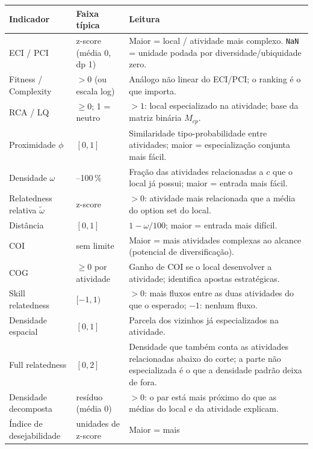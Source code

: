 \documentclass[12pt, a4paper]{article}
\begin{document}
{\renewcommand{\arraystretch}{1.35}\small
\begin{longtable}{>{\raggedright\arraybackslash}p{3.4cm}>{\raggedright\arraybackslash}p{3.0cm}>{\raggedright\arraybackslash}p{8.6cm}}
\toprule
\textbf{Indicador} & \textbf{Faixa t\'{i}pica} & \textbf{Leitura} \\
\midrule\endhead
ECI / PCI & z-score (m\'{e}dia 0, dp 1) & Maior = local / atividade mais
  complexo. \texttt{NaN} = unidade podada por diversidade/ubiquidade
  zero. \\
Fitness / Complexity & $> 0$ (ou escala log) & An\'{a}logo n\~{a}o linear
  do ECI/PCI; o ranking \'{e} o que importa. \\
RCA / LQ & $\geq 0$; 1 = neutro & $>1$: local especializado na
  atividade; base da matriz bin\'{a}ria $M_{cp}$. \\
Proximidade $\phi$ & $[0, 1]$ & Similaridade tipo-probabilidade entre
  atividades; maior = especializa\c{c}\~{a}o conjunta mais f\'{a}cil. \\
Densidade $\omega$ & 0--100\,\% & Fra\c{c}\~{a}o das atividades
  relacionadas a $c$ que o local j\'{a} possui; maior = entrada mais
  f\'{a}cil. \\
Relatedness relativa $\tilde\omega$ & z-score & $>0$: atividade mais
  relacionada que a m\'{e}dia do option set do local. \\
Dist\^{a}ncia & $[0, 1]$ & $1-\omega/100$; maior = entrada mais
  dif\'{i}cil. \\
COI & sem limite & Maior = mais atividades complexas ao alcance
  (potencial de diversifica\c{c}\~{a}o). \\
COG & $\geq 0$ por atividade & Ganho de COI se o local desenvolver a
  atividade; identifica apostas estrat\'{e}gicas. \\
Skill relatedness & $[-1, 1)$ & $>0$: mais fluxos entre as duas
  atividades do que o esperado; $-1$: nenhum fluxo. \\
Densidade espacial & $[0, 1]$ & Parcela dos vizinhos j\'{a}
  especializados na atividade. \\
Full relatedness & $[0, 2]$ & Densidade que tamb\'{e}m conta as
  atividades relacionadas abaixo do corte; a parte n\~{a}o especializada
  \'{e} o que a densidade padr\~{a}o deixa de fora. \\
Densidade decomposta & res\'{i}duo (m\'{e}dia 0) & $>0$: o par est\'{a} mais
  pr\'{o}ximo do que as m\'{e}dias do local e da atividade explicam. \\
\'{I}ndice de desejabilidade & unidades de z-score & Maior = mais

\end{longtable}}
\end{document}
